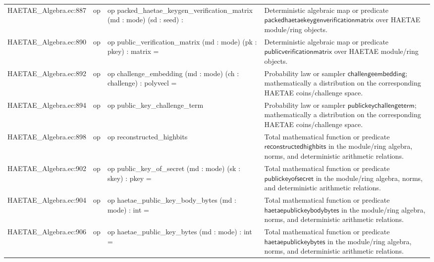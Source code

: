 \documentclass[10pt]{article}
\begin{document}
\begin{longtable}{L{0.11\textwidth}L{0.055\textwidth}L{0.385\textwidth}L{0.41\textwidth}}
HAETAE\_\allowbreak{}Algebra.\allowbreak{}ec:\allowbreak{}887 & op & {\ttfamily\scriptsize op packed\_\allowbreak{}haetae\_\allowbreak{}keygen\_\allowbreak{}verification\_\allowbreak{}matrix (md : mode) (sd : seed) :} & Deterministic algebraic map or predicate $\mathsf{packedhaetaekeygenverificationmatrix}$ over HAETAE module/ring objects. \\
HAETAE\_\allowbreak{}Algebra.\allowbreak{}ec:\allowbreak{}890 & op & {\ttfamily\scriptsize op public\_\allowbreak{}verification\_\allowbreak{}matrix (md : mode) (pk : pkey) : matrix =} & Deterministic algebraic map or predicate $\mathsf{publicverificationmatrix}$ over HAETAE module/ring objects. \\
HAETAE\_\allowbreak{}Algebra.\allowbreak{}ec:\allowbreak{}892 & op & {\ttfamily\scriptsize op challenge\_\allowbreak{}embedding (md : mode) (ch : challenge) : polyvecl =} & Probability law or sampler $\mathsf{challengeembedding}$; mathematically a distribution on the corresponding HAETAE coins/challenge space. \\
HAETAE\_\allowbreak{}Algebra.\allowbreak{}ec:\allowbreak{}894 & op & {\ttfamily\scriptsize op public\_\allowbreak{}key\_\allowbreak{}challenge\_\allowbreak{}term} & Probability law or sampler $\mathsf{publickeychallengeterm}$; mathematically a distribution on the corresponding HAETAE coins/challenge space. \\
HAETAE\_\allowbreak{}Algebra.\allowbreak{}ec:\allowbreak{}898 & op & {\ttfamily\scriptsize op reconstructed\_\allowbreak{}highbits} & Total mathematical function or predicate $\mathsf{reconstructedhighbits}$ in the module/ring algebra, norms, and deterministic arithmetic relations. \\
HAETAE\_\allowbreak{}Algebra.\allowbreak{}ec:\allowbreak{}902 & op & {\ttfamily\scriptsize op public\_\allowbreak{}key\_\allowbreak{}of\_\allowbreak{}secret (md : mode) (sk : skey) : pkey =} & Total mathematical function or predicate $\mathsf{publickeyofsecret}$ in the module/ring algebra, norms, and deterministic arithmetic relations. \\
HAETAE\_\allowbreak{}Algebra.\allowbreak{}ec:\allowbreak{}904 & op & {\ttfamily\scriptsize op haetae\_\allowbreak{}public\_\allowbreak{}key\_\allowbreak{}body\_\allowbreak{}bytes (md : mode) : int =} & Total mathematical function or predicate $\mathsf{haetaepublickeybodybytes}$ in the module/ring algebra, norms, and deterministic arithmetic relations. \\
HAETAE\_\allowbreak{}Algebra.\allowbreak{}ec:\allowbreak{}906 & op & {\ttfamily\scriptsize op haetae\_\allowbreak{}public\_\allowbreak{}key\_\allowbreak{}bytes (md : mode) : int =} & Total mathematical function or predicate $\mathsf{haetaepublickeybytes}$ in the module/ring algebra, norms, and deterministic arithmetic relations. \\

\end{longtable}
\end{document}
